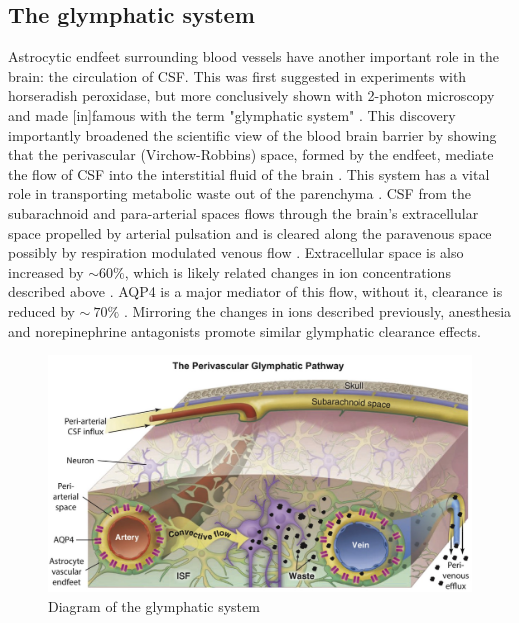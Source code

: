 \subsection*{The glymphatic system}
Astrocytic endfeet surrounding blood vessels have another important role in the brain: the circulation of CSF. This was first suggested in experiments with horseradish peroxidase, but more conclusively shown with 2-photon microscopy and made [in]famous with the term "glymphatic system" \citep{Rennels1985, Iliff2012}. This discovery importantly broadened the scientific view of the blood brain barrier by showing that the perivascular (Virchow-Robbins) space, formed by the endfeet, mediate the flow of CSF into the interstitial fluid of the brain \citep{Nedergaard2013}. This system has a vital role in transporting metabolic waste out of the parenchyma \citep{Jessen2015}. CSF from the subarachnoid and para-arterial spaces flows through the brain's extracellular space propelled by arterial pulsation and is cleared along the paravenous space possibly by respiration modulated venous flow \citep{Thrane2013, Dreha-Kulaczewski2015,Dreha-Kulaczewski2017a}. Extracellular space is also  increased by $\sim60\%$, which is likely related changes in ion concentrations described above \citep{Ding2016,Xie}. AQP4 is a major mediator of this flow, without it, clearance is reduced by $\sim~70\%$ \citep{Iliff2012}. Mirroring the changes in ions described previously, anesthesia and norepinephrine antagonists promote similar glymphatic clearance effects. 

\begin{figure}
  \centering
  \includegraphics[scale = .6]{Figures/Iliff_2017_GlymphaticSystem.jpg}
    \caption{Diagram of the glymphatic system \citep{Nedergaard2013}}
  \label{fig:glym}
\end{figure}

